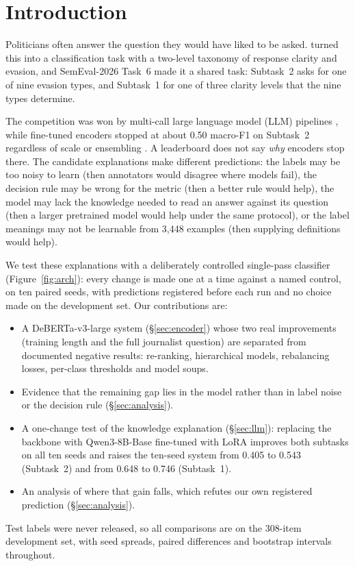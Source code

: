 \section{Introduction}
\label{sec:intro}
\FigureArch

Politicians often answer the question they would have liked to be asked.
\citet{thomas-etal-2024-never} turned this into a classification task with a two-level taxonomy of response clarity and evasion, and SemEval-2026 Task~6 \citep{thomas-etal-2026-semeval} made it a shared task: Subtask~2 asks for one of nine evasion types, and Subtask~1 for one of three clarity levels that the nine types determine.

The competition was won by multi-call large language model (LLM) pipelines \citep{shi-etal-2026-teleai,peerachaidecho-rutherford-2026-chulanlp}, while fine-tuned encoders stopped at about 0.50 macro-F1 on Subtask~2 regardless of scale or ensembling \citep{thomas-etal-2026-semeval}.
A leaderboard does not say \emph{why} encoders stop there.
The candidate explanations make different predictions: the labels may be too noisy to learn (then annotators would disagree where models fail), the decision rule may be wrong for the metric (then a better rule would help), the model may lack the knowledge needed to read an answer against its question (then a larger pretrained model would help under the same protocol), or the label meanings may not be learnable from 3,448 examples (then supplying definitions would help).

We test these explanations with a deliberately controlled single-pass classifier (Figure~\ref{fig:arch}): every change is made one at a time against a named control, on ten paired seeds, with predictions registered before each run and no choice made on the development set.
Our contributions are:
\begin{itemize}
  \item A DeBERTa-v3-large system (\S\ref{sec:encoder}) whose two real improvements (training length and the full journalist question) are separated from documented negative results: re-ranking, hierarchical models, rebalancing losses, per-class thresholds and model soups.
  \item Evidence that the remaining gap lies in the model rather than in label noise or the decision rule (\S\ref{sec:analysis}).
  \item A one-change test of the knowledge explanation (\S\ref{sec:llm}): replacing the backbone with Qwen3-8B-Base fine-tuned with LoRA \citep{qwen3,hu2022lora} improves both subtasks on all ten seeds and raises the ten-seed system from 0.405 to 0.543 (Subtask~2) and from 0.648 to 0.746 (Subtask~1).
  \item An analysis of where that gain falls, which refutes our own registered prediction (\S\ref{sec:analysis}).
\end{itemize}
Test labels were never released, so all comparisons are on the 308-item development set, with seed spreads, paired differences and bootstrap intervals throughout.
